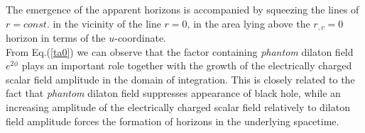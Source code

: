\documentclass[aps,showpacs,nofootinbib,floatfix]{revtex4}
\begin{document}
The emergence of the apparent horizons
is accompanied by squeezing the lines of $r=const.$ in the vicinity of the line $r=0$, in the area lying above 
the $r_{,v}=0$ horizon in terms of the $u$-coordinate.\\
From Eq.(\ref{ta0}) we can observe that the factor containing {\it phantom} dilaton field $e^{2 \phi}$ plays 
an important role together with the growth of the electrically charged scalar field amplitude
in the domain of integration. This is closely related to the fact that {\it phantom} dilaton field 
suppresses appearance of black hole, while an increasing amplitude of the electrically charged scalar 
field relatively to dilaton field amplitude forces the formation of horizons in the underlying spacetime.



\end{document}
